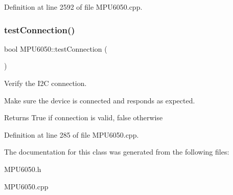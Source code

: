Definition at line 2592 of file M\+P\+U6050.\+cpp.

\mbox{\label{classMPU6050_a95ffab7b44fce3834236e0813687d11a}} 
\subsubsection{\texorpdfstring{testConnection()}{testConnection()}}
{\footnotesize\ttfamily bool M\+P\+U6050\+::test\+Connection (\begin{DoxyParamCaption}{ }\end{DoxyParamCaption})}



Verify the I2C connection. 

Make sure the device is connected and responds as expected. \begin{DoxyReturn}{Returns}
True if connection is valid, false otherwise 
\end{DoxyReturn}


Definition at line 285 of file M\+P\+U6050.\+cpp.



The documentation for this class was generated from the following files\+:\begin{DoxyCompactItemize}
\item 
M\+P\+U6050.\+h\item 
M\+P\+U6050.\+cpp\end{DoxyCompactItemize}
